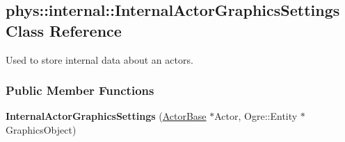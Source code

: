 \hypertarget{classphys_1_1internal_1_1InternalActorGraphicsSettings}{
\subsection{phys::internal::InternalActorGraphicsSettings Class Reference}
\label{classphys_1_1internal_1_1InternalActorGraphicsSettings}
}


Used to store internal data about an actors.  


\subsubsection*{Public Member Functions}
\begin{DoxyCompactItemize}
\item 
\hypertarget{classphys_1_1internal_1_1InternalActorGraphicsSettings_ab82ae94be294dd4dce58469b8f2f4f14}{
{\bfseries InternalActorGraphicsSettings} (\hyperlink{classphys_1_1ActorBase}{ActorBase} $\ast$Actor, Ogre::Entity $\ast$GraphicsObject)}
\label{classphys_1_1internal_1_1InternalActorGraphicsSettings_ab82ae94be294dd4dce58469b8f2f4f14}

\end{DoxyCompactItemize}
